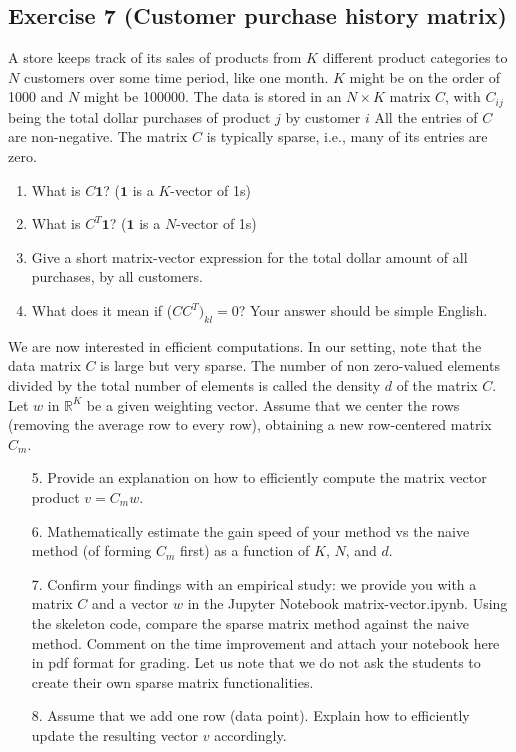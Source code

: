 \documentclass[11pt]{article}
\begin{document}
\newpage
\subsection*{Exercise 7 (Customer purchase history matrix)}

A store keeps track of its sales of products from $K$ different
product categories to $N$ customers over some time period, like one month. $K$ might be on the order of 1000 and $N$ might be 100000. The data is stored in an $N \times K$ matrix $C$, with $C_{ij}$ being the total dollar purchases of product $j$ by customer $i$ All the entries of $C$ are non-negative. The matrix $C$ is typically sparse, i.e., many of its entries are zero.

\begin{enumerate}
    \item What is $C \boldsymbol{1}$? ($\boldsymbol{1}$ is a $K$-vector of 1s)

    \item What is $C^T \boldsymbol{1}$? ($\boldsymbol{1}$ is a $N$-vector of 1s)

    \item Give a short matrix-vector expression for the total dollar amount of all purchases, by all customers.

    \item What does it mean if ($CC^T)_{kl} = 0$? Your answer should be simple English.
\end{enumerate}

We are now interested in efficient computations. In our setting, note that the data matrix $C$ is large but very sparse. The number of non zero-valued elements divided by the total number of elements is called the density $d$ of the matrix $C$. Let $w$ in $\mathbb{R}^K$ be a given weighting vector. Assume that we center the rows (removing the average row to every row), obtaining a new row-centered matrix $C_m$.

\begin{enumerate}
    \item[5.] Provide an explanation on how to efficiently compute the matrix vector product $v = C_m w$.

    \item[6.] Mathematically estimate the gain speed of your method vs the naive method (of forming $C_m$ first) as a function of $K$, $N$, and $d$.

    \item[7.] Confirm your findings with an empirical study: we provide you with a matrix $C$ and a vector $w$ in the Jupyter Notebook matrix-vector.ipynb. Using the skeleton code, compare the sparse matrix method against the naive method. Comment on the time improvement and attach your notebook here in pdf format for grading. Let us note that we do not ask the students to create their own sparse matrix functionalities.

    \item[8.] Assume that we add one row (data point). Explain how to efficiently update the resulting vector $v$ accordingly.
\end{enumerate}

\begin{solution}
\end{solution}
\end{document}
